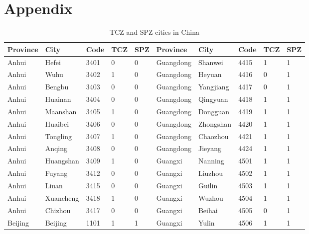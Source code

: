 \documentclass[12pt]{article}
\begin{document}
\section*{Appendix} \label{sec:appendixa}

\begin{table}[!htbp] \centering
  \caption{TCZ and SPZ cities in China}
  \begin{adjustbox}{width=\textwidth, totalheight=\baselineskip,keepaspectratio}
    \label{tab:appendix1}
\begin{tabular}{llllllllll}
\hline
Province  & City      & Code & TCZ & SPZ & Province     & City          & Code & TCZ & SPZ \\
\hline
Anhui     & Hefei     & 3401 & 0   & 0   & Guangdong    & Shanwei       & 4415 & 1   & 1   \\
Anhui     & Wuhu      & 3402 & 1   & 0   & Guangdong    & Heyuan        & 4416 & 0   & 1   \\
Anhui     & Bengbu    & 3403 & 0   & 0   & Guangdong    & Yangjiang     & 4417 & 0   & 1   \\
Anhui     & Huainan   & 3404 & 0   & 0   & Guangdong    & Qingyuan      & 4418 & 1   & 1   \\
Anhui     & Maanshan  & 3405 & 1   & 0   & Guangdong    & Dongguan      & 4419 & 1   & 1   \\
Anhui     & Huaibei   & 3406 & 0   & 0   & Guangdong    & Zhongshan     & 4420 & 1   & 1   \\
Anhui     & Tongling  & 3407 & 1   & 0   & Guangdong    & Chaozhou      & 4421 & 1   & 1   \\
Anhui     & Anqing    & 3408 & 0   & 0   & Guangdong    & Jieyang       & 4424 & 1   & 1   \\
Anhui     & Huangshan & 3409 & 1   & 0   & Guangxi      & Nanning       & 4501 & 1   & 1   \\
Anhui     & Fuyang    & 3412 & 0   & 0   & Guangxi      & Liuzhou       & 4502 & 1   & 1   \\
Anhui     & Liuan     & 3415 & 0   & 0   & Guangxi      & Guilin        & 4503 & 1   & 1   \\
Anhui     & Xuancheng & 3418 & 1   & 0   & Guangxi      & Wuzhou        & 4504 & 1   & 1   \\
Anhui     & Chizhou   & 3417 & 0   & 0   & Guangxi      & Beihai        & 4505 & 0   & 1   \\
Beijing   & Beijing   & 1101 & 1   & 1   & Guangxi      & Yulin         & 4506 & 1   & 1   \\

\end{tabular}
\end{adjustbox}
\end{table}
\end{document}
